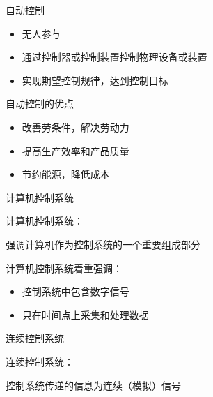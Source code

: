 \begin{frame}
\begin{block}{自动控制}
\begin{itemize}
\item 无人参与
\item 通过控制器或控制装置控制物理设备或装置
\item 实现期望控制规律，达到控制目标
\end{itemize}
\end{block}
\begin{block}{自动控制的优点}
\begin{itemize}
\item 改善劳条件，解决劳动力
\item 提高生产效率和产品质量
\item 节约能源，降低成本
\end{itemize}
\end{block}
\end{frame}
\begin{frame}[containsverbatim]{计算机控制系统}
\begin{definition}
计算机控制系统：

强调计算机作为控制系统的一个重要组成部分
\end{definition}
计算机控制系统着重强调：
\begin{itemize}
\item 控制系统中包含数字信号
\item 只在时间点上采集和处理数据
\end{itemize}
\end{frame}
\begin{frame}[containsverbatim]{连续控制系统}
\begin{definition}
连续控制系统：

控制系统传递的信息为连续（模拟）信号
\end{definition}
\begin{figure}[htbp]
\end{figure}
\end{frame}
